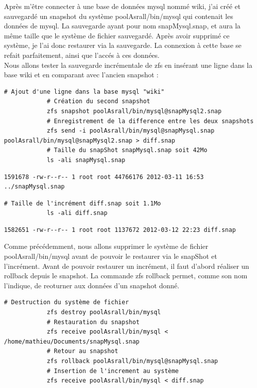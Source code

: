\documentclass[a4paper]{report}
\begin{document}
		Après m'être connecter à une base de données mysql nommé wiki, j'ai créé et sauvegardé un snapshot du système poolAsrall/bin/mysql qui contenait les données de mysql. La sauvegarde ayant pour nom snapMysql.snap, et aura la même taille que le système de fichier sauvegardé. Après avoir supprimé ce système, je l'ai donc restaurer via la sauvegarde. La connexion à cette base se refait parfaitement, ainsi que l'accés à ces données. \\
		Nous allons tester la sauvegarde incrémentale de zfs en insérant une ligne dans la base wiki et en comparant avec l'ancien snapshot :\\
		\begin{lstlisting}[language=ksh,texcl]
			# Ajout d'une ligne dans la base mysql "wiki"
			# Création du second snapshot
			zfs snapshot poolAsrall/bin/mysql@snapMysql2.snap
			# Enregistrement de la difference entre les deux snapshots
			zfs send -i poolAsrall/bin/mysql@snapMysql.snap poolAsrall/bin/mysql@snapMysql2.snap > diff.snap
			# Taille du snapShot snapMysql.snap soit 42Mo
			ls -ali snapMysql.snap
		\end{lstlisting}
		\begin{lstlisting}[backgroundcolor=\color{yellow}]
			1591678 -rw-r--r-- 1 root root 44766176 2012-03-11 16:53 ../snapMysql.snap
		\end{lstlisting}
		\begin{lstlisting}[language=ksh,texcl]
			# Taille de l'incrément diff.snap soit 1.1Mo
			ls -ali diff.snap
		\end{lstlisting}
		\begin{lstlisting}[backgroundcolor=\color{yellow}]
			1582651 -rw-r--r-- 1 root root 1137672 2012-03-12 22:23 diff.snap
		\end{lstlisting}
		Comme précédemment, nous allons supprimer le système de fichier poolAsrall/bin/mysql avant de pouvoir le restaurer via le snapShot et l'incrément. Avant de pouvoir restaurer un incrément, il faut d'abord réaliser un rollback depuis le snapshot. La commande zfs rollback permet, comme son nom l'indique, de reoturner aux données d'un snapshot donné.
		\begin{lstlisting}[language=ksh,texcl]
			# Destruction du système de fichier
			zfs destroy poolAsrall/bin/mysql
			# Restauration du snapshot
			zfs receive poolAsrall/bin/mysql < /home/mathieu/Documents/snapMysql.snap
			# Retour au snapshot
			zfs rollback poolAsrall/bin/mysql@snapMysql.snap
			# Insertion de l'increment au système
			zfs receive poolAsrall/bin/mysql < diff.snap
		\end{lstlisting}	
\end{document}

